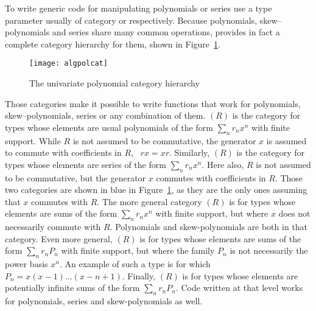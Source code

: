 To write generic code for manipulating polynomials or series
use a type parameter usually of category
or  respectively.
Because polynomials, skew--polynomials and series share
many common operations, \libalgebra{} provides in fact a complete
category hierarchy for them, shown in Figure~\ref{fig:stdpolcat}.
\begin{figure}[htb!]
\begin{center}
\texttt{[image: algpolcat]}
\end{center}
\caption{The \libalgebra{} univariate polynomial category hierarchy}
\label{fig:stdpolcat}
\end{figure}
Those categories make it possible to write functions
that work for polynomials, skew--polynomials, series
or any combination of them.
$(R)$ is the category
for types whose elements are usual polynomials of
the form $\sum_n r_n x^n$ with finite support. While
$R$ is not assumed to be commutative, the generator $x$
is assumed to commute with coefficients in $R$, \ie~$rx = xr$.
Similarly, $(R)$
is the category for types whose elements are series of
the form $\sum_n r_n x^n$. Here also, $R$ is not assumed
to be commutative, but the generator $x$ commutes with
coefficients in $R$. Those two categories are shown
in blue in Figure~\ref{fig:stdpolcat}, as they are the only ones assuming
that $x$ commutes with $R$.
The more general category $(R)$
is for types whose elements are sums of the form $\sum_n r_n x^n$ with
finite support, but where $x$ does not necessarily commute with $R$.
Polynomials and skew-polynomials are both in that category.
Even more general, $(R)$
is for types whose elements are sums of the form $\sum_n r_n P_n$ with
finite support, but where the family $P_n$ is not necessarily the
power basis $x^n$. An example of such a type is
 for which
$P_n = x(x-1)\dots(x-n+1)$. Finally, $(R)$
is for types whose elements are potentially infinite sums of the form
$\sum_n r_n P_n$. Code written at that level works for polynomials, series
and skew-polynomials as well.

